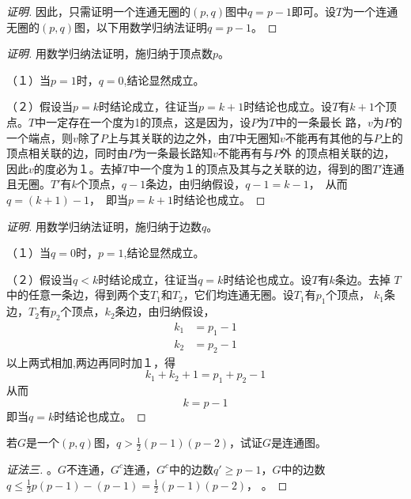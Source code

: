 \documentclass{beamer}
\begin{document}
\begin{CJK}{UTF8}{gbsn}
\begin{frame}
\begin{proof}[证明]
    因此，只需证明一个连通无圈的$(p,q)$图中$q=p-1$即可。设$T$为一个连通无圈的$(p,q)$图，以下用数学归纳法证明$q=p-1$。
  \end{proof}
\end{frame}
\begin{frame}
  \begin{proof}[证明]
  
    用数学归纳法证明，施归纳于顶点数$p$。
    
    （１）当$p=1$时，$q=0$,结论显然成立。

    （２）假设当$p=k$时结论成立，往证当$p=k+1$时结论也成立。设$T$有$k+1$个顶点。$T$中一定存在一个度为1的顶点，这是因为，设$P$为$T$中的一条最长
    路，$v$为$P$的一个端点，则$v$除了$P$上与其关联的边之外，由$T$中无圈知$v$不能再有其他的与$P$上的顶点相关联的边，同时由$P$为一条最长路知$v$不能再有与$P$外
    的顶点相关联的边，因此$v$的度必为１。去掉$T$中一个度为１的顶点及其与之关联的边，得到的图$T'$连通且无圈。$T'$有$k$个顶点，$q-1$条边，由归纳假设，$q-1 = k - 1$，　从而$q = (k +1) - 1$，　即当$p=k+1$时结论也成立。
  \end{proof}
\end{frame}

\begin{frame}
\begin{proof}[证明]
        用数学归纳法证明，施归纳于边数$q$。
    
    （１）当$q=0$时，$p=1$,结论显然成立。

    （２）假设当$q<k$时结论成立，往证当$q=k$时结论也成立。设$T$有$k$条边。去掉
    $T$中的任意一条边，得到两个支$T_1$和$T_2$，它们均连通无圈。设$T_1$有$p_1$个顶点，
    $k_1$条边，$T_2$有$p_2$个顶点，$k_2$条边，由归纳假设，
    \begin{equation*}
      \begin{split}
        k_1 &= p_1 - 1\\
        k_2 &= p_2 - 1
      \end{split}
    \end{equation*}
    以上两式相加,两边再同时加１，得
    \[k_1 + k_2  + 1 = p_1 + p_2 - 1\]
    从而
    \[k = p - 1 \]
    即当$q=k$时结论也成立。
\end{proof}
\end{frame}
\begin{frame}
  \begin{Exercise}
    若$G$是一个$(p,q)$图，$q > \frac{1}{2}(p-1)(p-2)$，试证$G$是连通图。  
  \end{Exercise}
\pause\begin{proof}[证法三]\justifying\let\raggedright\justifying
  。$G$不连通，$G^c$连通，$G^c$中的边数$q'\geq p-1$，$G$中的边数$q\leq \frac{1}{2}p(p-1)-(p-1)=\frac{1}{2}(p-1)(p-2)$，
  。
\end{proof}
\end{frame}


\end{CJK}
\end{document}
